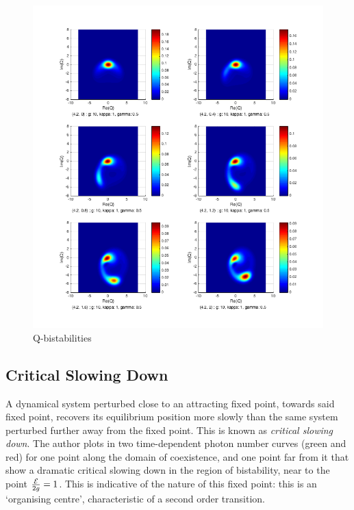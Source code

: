 \begin{figure}[h]
\begin{minipage}{.5\linewidth}
      \includegraphics[width=1\textwidth]{Images/Q-Bistability.png}
  \end{minipage}
  \caption{Q-bistabilities}\label{fig:Qbistabilities}
\end{figure}
\subsection{Critical Slowing Down}

A dynamical system perturbed close to an attracting fixed point, towards said fixed point, recovers its equilibrium position more slowly than the same system perturbed further away from the fixed point. This is known as \emph{critical slowing down}\autocite[40, 56]{Strogatz1994}. The author plots in \autocite[Figure 3]{Carmichael2015} two time-dependent photon number curves (green and red) for one point along the domain of coexistence, and one point far from it that show a dramatic critical slowing down in the region of bistability, near to the point $\frac{\mathcal{E}}{2g} = 1$. This is indicative of the nature of this fixed point: this is an `organising centre', characteristic of a second order transition.

